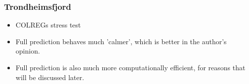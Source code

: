 \subsubsection{Trondheimsfjord}
\begin{itemize}
    \item COLREGs stress test
    \item Full prediction behaves much 'calmer', which is better in the author's opinion.
    \item Full prediction is also much more computationally efficient, for reasons that will be discussed later.
\end{itemize}




